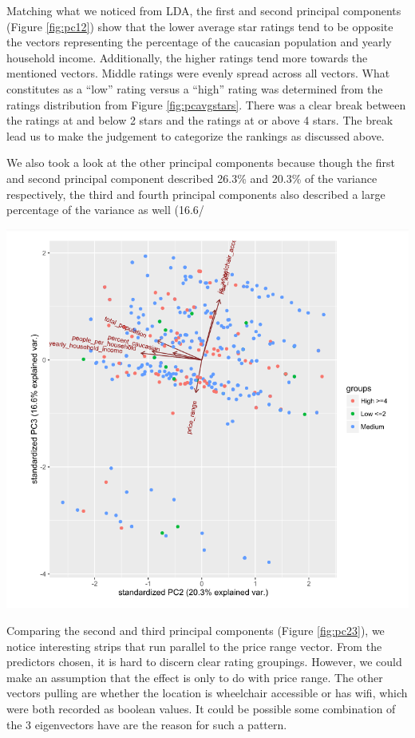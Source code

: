 \documentclass{article}
\newenvironment{Figure}
  {\par\medskip\noindent\minipage{\linewidth}}
  {\endminipage\par\medskip}
\begin{document}
\begin{multicols}{2}
Matching what we noticed from LDA, the first and second principal components (Figure \ref{fig:pc12}) show that the lower average star ratings tend to be opposite the vectors representing the percentage of the caucasian population and yearly household income. Additionally, the higher ratings tend more towards the mentioned vectors. Middle ratings were evenly spread across all vectors. What constitutes as a “low” rating versus a “high” rating was determined from the ratings distribution from Figure  \ref{fig:pcavgstars}. There was a clear break between the ratings at and below 2 stars and the ratings at or above 4 stars. The break lead us to make the judgement to categorize the rankings as discussed above. 

We also took a look at the other principal components because though the first and second principal component described 26.3\% and 20.3\% of the variance respectively, the third and fourth principal components also described a large percentage of the variance as well (16.6/%

\begin{Figure}
\centering
   \includegraphics[width=\linewidth]{pc23}
	\label{fig:pc23}
\end{Figure}

Comparing the second and third principal components (Figure \ref{fig:pc23}), we notice interesting strips that run parallel to the price range vector. From the predictors chosen, it is hard to discern clear rating groupings. However, we could make an assumption that the effect is only to do with price range. The other vectors pulling are whether the location is wheelchair accessible or has wifi, which were both recorded as boolean values. It could be possible some combination of the 3 eigenvectors have are the reason for such a pattern. 


\end{multicols}
\end{document}
